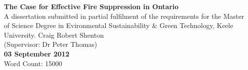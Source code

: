 \documentclass{article}
\begin{document}

\begin{titlepage}
\begin{center}

{ \Large \bfseries The Case for Effective Fire Suppression in Ontario}\\[4cm] \vfill
A dissertation submitted in partial fulfilment of the requirements for the Master of Science Degree in Evironmental Sustainability \& Green Technology, Keele University. \vfill
Craig Robert Shenton\\
(Supervisor: Dr Peter Thomas)\\[.5cm]

\textbf{03 September 2012}\\[.5cm]

Word Count: 15000

\end{center}
\end{titlepage}
\end{document}
